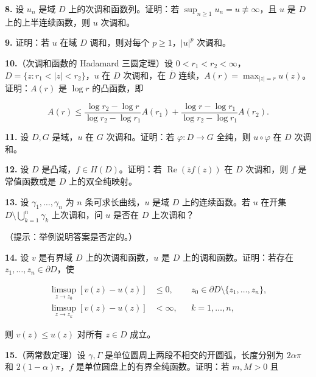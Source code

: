 \documentclass[11pt,a4paper]{article}
\begin{document}
\par{}
\noindent\textbf{8.} 设 \(u_n\) 是域 \(D\) 上的次调和函数列。证明：若
\(\sup_{n\ge1}u_n=u\not\equiv\infty\)，且 \(u\) 是 \(D\)
上的上半连续函数，则 \(u\) 次调和。

\par{}
\noindent\textbf{9.} 证明：若 \(u\) 在域 \(D\) 调和，则对每个
\(p\ge1\)，\(|u|^p\) 次调和。

\par{}
\noindent\textbf{10.}（次调和函数的 Hadamard 三圆定理）设
\(0<r_1<r_2<\infty\)，\(D=\{z:r_1<|z|<r_2\}\)，\(u\) 在 \(D\) 次调和，在
\(\overline D\) 连续，\(A(r)=\max_{|z|=r}u(z)\)。证明：\(A(r)\) 是
\(\log r\) 的凸函数，即

\[
A(r)\le\frac{\log r_2-\log r}{\log r_2-\log r_1}A(r_1)
+\frac{\log r-\log r_1}{\log r_2-\log r_1}A(r_2).
\]

\par{}
\noindent\textbf{11.} 设 \(D,G\) 是域，\(u\) 在 \(G\) 次调和。证明：若
\(\varphi:D\to G\) 全纯，则 \(u\circ\varphi\) 在 \(D\) 次调和。

\par{}
\noindent\textbf{12.} 设 \(D\) 是凸域，\(f\in H(D)\)。证明：若
\(\operatorname{Re}(\overline z f(z))\) 在 \(D\) 次调和，则 \(f\)
是常值函数或是 \(D\) 上的双全纯映射。

\par{}
\noindent\textbf{13.} 设 \(\gamma_1,\ldots,\gamma_n\) 为 \(n\)
条可求长曲线，\(u\) 是域 \(D\) 上的连续函数。若 \(u\) 在开集
\(D\setminus\bigcup_{k=1}^n\gamma_k\) 上次调和，问 \(u\) 是否在 \(D\)
上次调和？

（提示：举例说明答案是否定的。）

\par{}
\noindent\textbf{14.} 设 \(v\) 是有界域 \(D\) 上的次调和函数，\(u\) 是 \(D\)
上的调和函数。证明：若存在 \(z_1,\ldots,z_n\in\partial D\)，使

\[
\begin{aligned}
\limsup_{z\to z_0}[v(z)-u(z)]&\le0,
&&z_0\in\partial D\setminus\{z_1,\ldots,z_n\},\\
\limsup_{z\to z_k}[v(z)-u(z)]&<\infty,
&&k=1,\ldots,n,
\end{aligned}
\]

则 \(v(z)\le u(z)\) 对所有 \(z\in D\) 成立。

\par{}
\noindent\textbf{15.}（两常数定理）设 \(\gamma,\Gamma\)
是单位圆周上两段不相交的开圆弧，长度分别为 \(2\alpha\pi\) 和
\(2(1-\alpha)\pi\)，\(f\) 是单位圆盘上的有界全纯函数。证明：若 \(m,M>0\)
且
\end{document}
